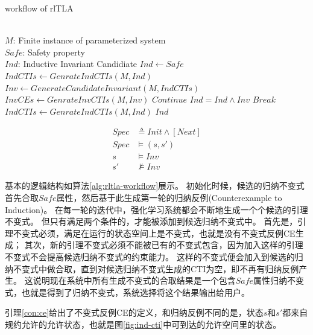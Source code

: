 \begin{algorithm}[ht]
    \caption[short]{workflow of rlTLA}
    \label{alg:rltla-workflow}
    
    \begin{algorithmic}[1]
        \REQUIRE \ \\
        $M$: Finite instance of parameterized system\\
        $Safe$: Safety property
		\ENSURE \ \\
        $Ind$: Inductive Invariant Candidiate
		\STATE $Ind \gets Safe$
        \STATE $IndCTIs \gets GenrateIndCTIs(M, Ind)$
                \STATE $Inv \gets GenerateCandidateInvariant(M, IndCTIs)$
                \STATE $InvCEs \gets GenrateInvCTIs(M, Inv)$
                    \STATE $Continue$
                \ENDIF
                    \STATE $Ind = Ind \wedge Inv$
                    \STATE $Break$
                \ENDIF
            \ENDWHILE
            \STATE $IndCTIs \gets GenrateIndCTIs(M, Ind)$
        \ENDWHILE
        \RETURN $Ind$
    \end{algorithmic}
\end{algorithm}

\begin{align}
    Spec &\triangleq Init \wedge [Next] \\
	Spec &\vDash (s, s') \label{con:ce} \\ 
	s &\vDash  Inv \\
	s' &\nvDash  Inv 
\end{align}

基本的逻辑结构如算法\ref{alg:rltla-workflow}展示。
初始化时候，候选的归纳不变式首先合取$Safe$属性，然后基于此生成第一轮的归纳反例(Counterexample to Induction)。
在每一轮的迭代中，强化学习系统都会不断地生成一个个候选的引理不变式。
但只有满足两个条件的，才能被添加到候选归纳不变式中。
首先是，引理不变式必须，满足在运行的状态空间上是不变式，也就是没有不变式反例CE生成；
其次，新的引理不变式必须不能被已有的不变式包含，因为加入这样的引理不变式不会提高候选归纳不变式的约束能力。
这样的不变式便会加入到候选的归纳不变式中做合取，直到对候选归纳不变式生成的CTI为空，即不再有归纳反例产生。
这说明现在系统中所有生成不变式的合取结果是一个包含$Safe$属性归纳不变式，也就是得到了归纳不变式，系统选择将这个结果输出给用户。

引理\ref{con:ce}给出了不变式反例CE的定义，和归纳反例不同的是，状态$s$和$s'$都来自规约允许的允许状态，也就是图\ref{fig:ind-cti}中可到达的允许空间里的状态。

